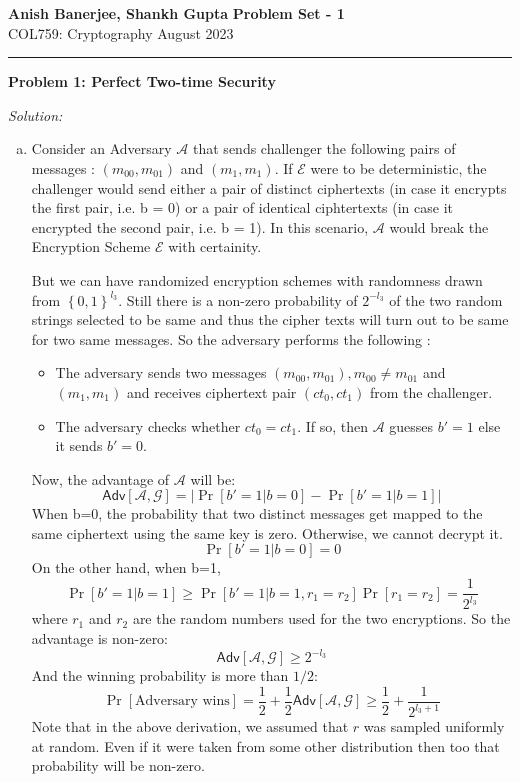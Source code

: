 \documentclass[a4paper, 11pt]{article}
\newcommand{\hr}{\noindent\rule{7in}{2.8pt}}
\newenvironment{solution}
    {\textit{Solution:}}
    {\clearpage}
\newcommand{\prob}[1]{\begin{mdframed}[backgroundcolor=gray!20] \textbf{Problem #1}\end{mdframed}}
\newcommand{\bit}{\left\{0, 1\right\}}
\newcommand{\calA}{\mathcal{A}}
\newcommand{\calE}{\mathcal{E}}
\newcommand{\calG}{\mathcal{G}}
\begin{document}
\noindent
\large\textbf{Anish Banerjee, Shankh Gupta} \hfill \textbf{Problem Set - 1}   \\
\normalsize COL759: Cryptography \hfill August 2023\\
\hr


\prob{1: Perfect Two-time Security}
\begin{solution}
    \begin{enumerate}[(a)]
        \item Consider an Adversary $\calA$ that sends challenger the following pairs of messages : $(m_{00}, m_{01})$ and $(m_1, m_1)$. If $\calE$ were to be deterministic, the challenger would send either a pair of distinct ciphertexts (in case it encrypts the first pair, i.e. b = 0) or a pair of identical ciphtertexts (in case it encrypted the second pair, i.e. b = 1). In this scenario, $\calA$ would break the Encryption Scheme $\calE$ with certainity.
        
        But we can have randomized encryption schemes with randomness drawn from $\bit^{l_3}$. Still there is a non-zero probability of ${2^{-l_3}}$ of the two random strings selected to be same and thus the cipher texts will turn out to be same for two same messages. So the adversary performs the following : 
        
        \begin{itemize}
            \item The adversary sends two messages $(m_{00}, m_{01}), m_{00}\neq m_{01}$ and $(m_1, m_1)$ and receives ciphertext pair $(ct_0, ct_1)$ from the challenger.
            \item The adversary checks whether $ct_0 = ct_1$. If so, then $\calA$ guesses $b' = 1$ else it sends $b' = 0$.
        \end{itemize}
        Now, the advantage of $\calA$ will be:
        $$\mathsf{Adv}[\calA, \calG] =  \Big| \Pr[b'=1|b=0] - \Pr[b'=1|b=1] \Big| $$
        When b=0, the probability that two distinct messages get mapped to the same ciphertext using the same key is zero. Otherwise, we cannot decrypt it.
        $$\Pr[b'=1|b=0]=0$$
        On the other hand, when b=1, 
        $$\Pr[b'=1|b=1]\geq\Pr[b'=1|b=1, r_1=r_2]\Pr[r_1=r_2]=\frac{1}{2^{l_3}}$$ 
        where $r_1$ and $r_2$ are the random numbers used for the two encryptions. So the advantage is non-zero:
        $$\mathsf{Adv}[\calA,\calG] \geq 2^{-l_3}  $$
        And the winning probability is more than $1/2$:
        $$\Pr[\text{Adversary wins}]=\frac12+\frac12\mathsf{Adv}[\calA,\calG] \geq\frac{1}{2} + \frac{1}{2^{l_3 + 1}}$$
        Note that in the above derivation, we assumed that $r$ was sampled uniformly at random. Even if it were taken from some other distribution then too that probability will be non-zero.


\end{enumerate}
\end{solution}
\end{document}
